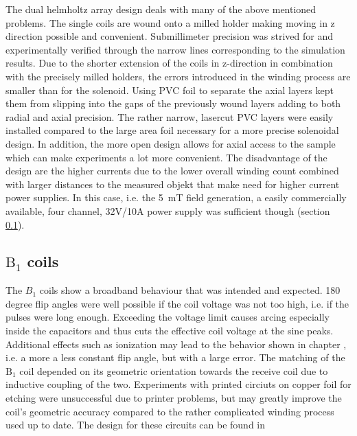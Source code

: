         The dual helmholtz array design deals with many of the above mentioned problems. The single coils are wound onto a milled holder making moving in z direction possible and convenient. Submillimeter precision was strived for and experimentally verified through the narrow lines corresponding to the simulation results. Due to the shorter extension of the coils in z-direction in combination with the precisely milled holders, the errors introduced in the winding process are smaller than for the solenoid. Using PVC foil to separate the axial layers kept them from slipping into the gaps of the previously wound layers adding to both radial and axial precision. The rather narrow, lasercut PVC layers were easily installed compared to the large area foil necessary for a more precise solenoidal design.
        In addition, the more open design allows for axial access to the sample which can make experiments a lot more convenient. The disadvantage of the design are the higher currents due to the lower overall winding count combined with larger distances to the measured objekt that make need for higher current power supplies. In this case, i.e. the \SI{5}{\milli\tesla} field generation, a easily commercially available, four channel, 32V/10A power supply was sufficient though (section \ref{}).
    \subsection{$\mathrm{B}_1$ coils}
    The $B_1$ coils show a broadband behaviour that was intended and expected. 180 degree flip angles were well possible if the coil voltage was not too high, i.e. if the pulses were long enough. Exceeding the voltage limit causes arcing especially inside the capacitors and thus cuts the effective coil voltage at the sine peaks. Additional effects such as ionization may lead to the behavior shown in chapter , i.e. a more a less constant flip angle, but with a large error.
    The matching of the $\mathrm{B_1}$ coil depended on its geometric orientation towards the receive coil due to inductive coupling of the two.
    Experiments with printed circiuts on copper foil for etching were unsuccessful due to printer problems, but may greatly improve the coil's geometric accuracy compared to the rather complicated winding process used up to date. The design for these circuits can be found in 
